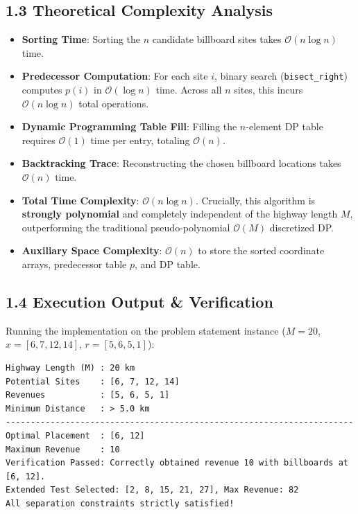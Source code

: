 \documentclass[12pt]{article}
\begin{document}
\subsection*{1.3 Theoretical Complexity Analysis}
\begin{itemize}
    \item \textbf{Sorting Time}: Sorting the $n$ candidate billboard sites takes $\mathcal{O}(n \log n)$ time.
    \item \textbf{Predecessor Computation}: For each site $i$, binary search (\texttt{bisect\_right}) computes $p(i)$ in $\mathcal{O}(\log n)$ time. Across all $n$ sites, this incurs $\mathcal{O}(n \log n)$ total operations.
    \item \textbf{Dynamic Programming Table Fill}: Filling the $n$-element DP table requires $\mathcal{O}(1)$ time per entry, totaling $\mathcal{O}(n)$.
    \item \textbf{Backtracking Trace}: Reconstructing the chosen billboard locations takes $\mathcal{O}(n)$ time.
    \item \textbf{Total Time Complexity}: $\mathcal{O}(n \log n)$. Crucially, this algorithm is \textbf{strongly polynomial} and completely independent of the highway length $M$, outperforming the traditional pseudo-polynomial $\mathcal{O}(M)$ discretized DP.
    \item \textbf{Auxiliary Space Complexity}: $\mathcal{O}(n)$ to store the sorted coordinate arrays, predecessor table $p$, and DP table.
\end{itemize}

\subsection*{1.4 Execution Output \& Verification}
Running the implementation on the problem statement instance ($M = 20$, $x = [6, 7, 12, 14]$, $r = [5, 6, 5, 1]$):
\begin{lstlisting}
Highway Length (M) : 20 km
Potential Sites    : [6, 7, 12, 14]
Revenues           : [5, 6, 5, 1]
Minimum Distance   : > 5.0 km
----------------------------------------------------------------------
Optimal Placement  : [6, 12]
Maximum Revenue    : 10
Verification Passed: Correctly obtained revenue 10 with billboards at [6, 12].
Extended Test Selected: [2, 8, 15, 21, 27], Max Revenue: 82
All separation constraints strictly satisfied!
\end{lstlisting}

\newpage

\end{document}
